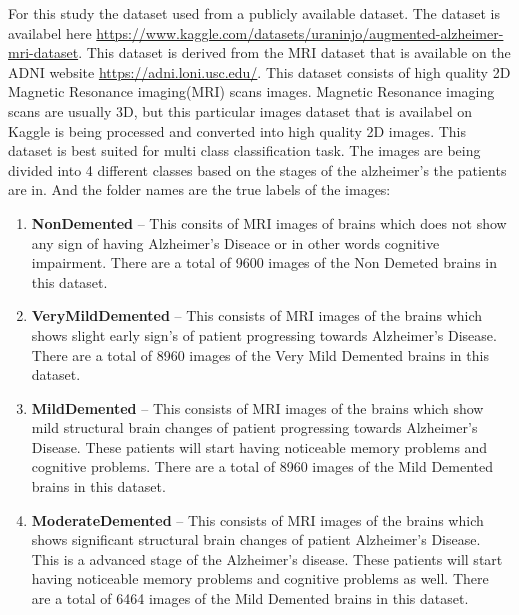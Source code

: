 \documentclass[12pt,onecolumn]{report}
\begin{document}
For this study the dataset used from a publicly available dataset. The dataset is availabel here \url{https://www.kaggle.com/datasets/uraninjo/augmented-alzheimer-mri-dataset}. This dataset is derived from the MRI dataset that is available on the ADNI website \url{https://adni.loni.usc.edu/}. This dataset consists of high quality 2D Magnetic Resonance imaging(MRI) scans images. Magnetic Resonance imaging scans are usually 3D, but this particular images dataset that is availabel on Kaggle is being processed and converted into high quality 2D images. This dataset is best suited for multi class classification task. The images are being divided into 4 different classes based on the stages of the alzheimer's the patients are in. And the folder names are the true labels of the images:
\begin{enumerate}
    \item \textbf{NonDemented} – This consits of MRI images of brains which does not show any sign of having Alzheimer’s Diseace or in other words cognitive impairment. There are a total of 9600 images of the Non Demeted brains in this dataset.
    \item \textbf{VeryMildDemented} – This consists of MRI images of the brains which shows slight early sign's of patient progressing towards Alzheimer’s Disease. There are a total of 8960 images of the Very Mild Demented brains in this dataset.
    \item \textbf{MildDemented} – This consists of MRI images of the brains which show mild structural brain changes of patient progressing towards Alzheimer’s Disease. These patients will start having noticeable memory problems and cognitive problems. There are a total of 8960 images of the Mild Demented brains in this dataset.
    \item \textbf{ModerateDemented} – This consists of MRI images of the brains which shows significant structural brain changes of patient Alzheimer’s Disease. This is a advanced stage of the Alzheimer’s disease. These patients will start having noticeable memory problems and cognitive problems as well. There are a total of 6464 images of the Mild Demented brains in this dataset.
\end{enumerate}
\end{document}

